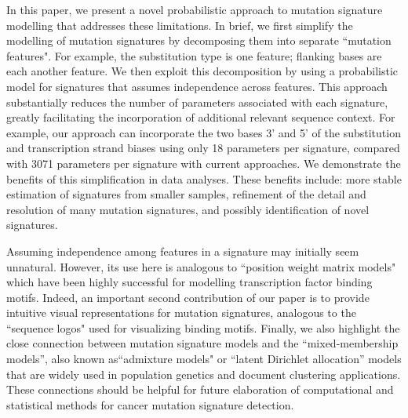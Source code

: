 \documentclass[10pt,letterpaper]{article}
\begin{document}
In this paper, we present a novel probabilistic approach 
to mutation signature modelling that addresses these limitations.
In brief, we first simplify the modelling of mutation signatures by decomposing them into separate ``mutation features".
For example, the substitution type is one feature; flanking bases are each another feature. We then exploit this 
decomposition by using a probabilistic model for signatures that assumes independence across features. This approach substantially reduces the number of parameters associated with
each signature, greatly facilitating the incorporation of additional relevant sequence context. 
For example, our approach can incorporate the two bases 3' and 5' of the substitution and transcription strand biases using only 18 parameters
per signature, compared with 3071 parameters per signature with current approaches. We demonstrate the benefits of this simplification in data analyses. These benefits include: more stable estimation of signatures from smaller samples, 
refinement of the detail and resolution of many mutation signatures, and possibly identification of novel signatures.

Assuming independence among features in a signature may initially seem unnatural. However, its use here is analogous to ``position weight matrix models" which have been highly
successful 
for modelling transcription factor binding motifs.
Indeed, an important second contribution of
our paper is to provide intuitive visual representations for mutation signatures,
analogous to the ``sequence logos" used for visualizing binding motifs.
Finally, we also highlight the close connection
between mutation signature models and the ``mixed-membership models'',
also known as``admixture models" \cite{pmid10835412} or ``latent Dirichlet allocation''
models \cite{Blei:2003} that are widely used in population genetics 
and document clustering applications.
These connections should be helpful for future elaboration of 
computational and statistical methods for cancer mutation signature detection. 



\end{document}
